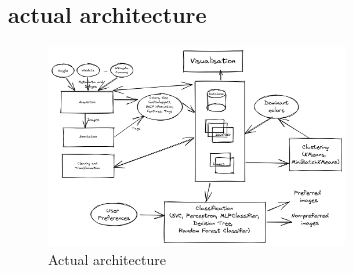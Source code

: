 \documentclass{article}
\begin{document}
    \subsection{actual architecture}\label{subsec:actual_architecture}

    \begin{figure}[htbp]
        \centering
        \includegraphics[width=0.7\textwidth]{targeted_archi} %
        \caption{Actual architecture}
        \label{fig:actual_architecture}
    \end{figure}
\end{document}
